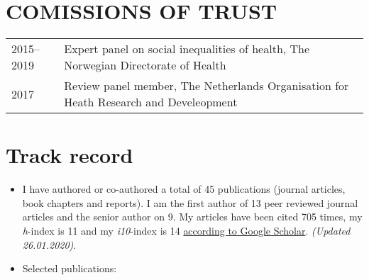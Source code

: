 \documentclass[11pt,a4paper,a4paper]{article}
\providecommand{\tightlist}{%
  \setlength{\itemsep}{0pt}\setlength{\parskip}{0pt}}
\newcounter{papers}
\begin{document}
\hypertarget{comissions-of-trust}{%
\section{COMISSIONS OF TRUST}\label{comissions-of-trust}}

\begin{tabular}{ll}
  2015--2019 & Expert panel on social inequalities of health, The Norwegian Directorate of Health \\ 
  2017 & Review panel member, The Netherlands Organisation for Heath Research and Develeopment \\ 
  \end{tabular}

\hypertarget{track-record}{%
\section{Track record}\label{track-record}}

\begin{itemize}
\tightlist
\item
  I have authored or co-authored a total of 45 publications (journal articles, book chapters and reports). I am the first author of 13 peer reviewed journal articles and the senior author on 9. My articles have been cited 705 times, my \emph{h}-index is 11 and my \emph{i10}-index is 14 \href{https://scholar.google.com/citations?user=TMC38ZgAAAAJ\&hl=en}{according to Google Scholar}. \emph{(Updated 26.01.2020)}.
\item
  Selected publications:
  \newrefcontext[sorting=none]\setcounter{papers}{0}\pagebreak[3]\printbibliography[category=bib-/Users/st06810/Dropbox/AkademiskCV/tpubs_zot.bib-1632235,heading=none]\setcounter{papers}{0}
\end{itemize}

\nocite{BoeSocioeconomicstatuschildren2012,
BoeSocioeconomicstatuschild2014,
BoeInterplaySubjectiveObjective2019a,
BoeCumulativeeffectsnegative2017,
BoeEconomicvolatilitychildhood2017,
Arntzen29recommendationscombat2019,
BoeFinancialdifficultieschildhood2017,
Boestrengthsdifficultiesquestionnaire2016,
SmidMeasurementEquivalenceConvergent2018,
BoeSosiookonomiskstatusog2015}
\end{document}

